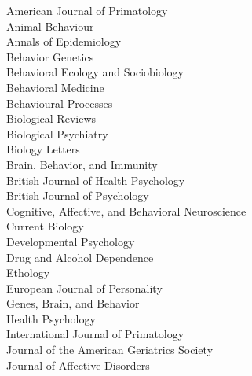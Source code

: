 \documentclass[11pt]{article}
\begin{document}
\begin{minipage}[t]{0.49\linewidth}
American Journal of Primatology \\
Animal Behaviour \\
Annals of Epidemiology \\
Behavior Genetics \\
Behavioral Ecology and Sociobiology \\
Behavioral Medicine \\
Behavioural Processes \\
Biological Reviews \\
Biological Psychiatry \\
Biology Letters \\
Brain, Behavior, and Immunity \\
British Journal of Health Psychology \\
British Journal of Psychology \\
Cognitive, Affective, and Behavioral Neuroscience \\
Current Biology \\
Developmental Psychology \\
Drug and Alcohol Dependence \\
Ethology \\
European Journal of Personality \\
Genes, Brain, and Behavior \\
Health Psychology \\
International Journal of Primatology \\
Journal of the American Geriatrics Society \\
Journal of Affective Disorders

\end{minipage}
\hfill
\end{document}
